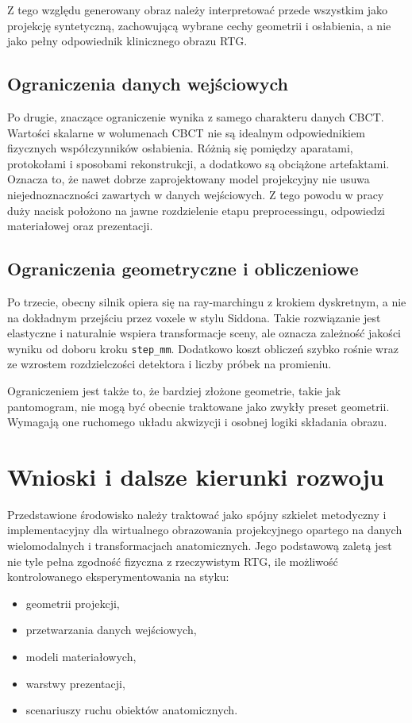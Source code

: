 \documentclass[11pt,a4paper]{article}
\begin{document}
Z tego względu generowany obraz należy interpretować przede wszystkim jako projekcję
syntetyczną, zachowującą wybrane cechy geometrii i osłabienia, a nie jako pełny
odpowiednik klinicznego obrazu RTG.

\subsection{Ograniczenia danych wejściowych}

Po drugie, znaczące ograniczenie wynika z samego charakteru danych CBCT.
Wartości skalarne w wolumenach CBCT nie są idealnym odpowiednikiem fizycznych
współczynników osłabienia. Różnią się pomiędzy aparatami, protokołami i sposobami
rekonstrukcji, a dodatkowo są obciążone artefaktami. Oznacza to, że nawet dobrze
zaprojektowany model projekcyjny nie usuwa niejednoznaczności zawartych w danych
wejściowych. Z tego powodu w pracy duży nacisk położono na jawne rozdzielenie
etapu preprocessingu, odpowiedzi materiałowej oraz prezentacji.

\subsection{Ograniczenia geometryczne i obliczeniowe}

Po trzecie, obecny silnik opiera się na ray-marchingu z krokiem dyskretnym, a nie
na dokładnym przejściu przez voxele w stylu Siddona. Takie rozwiązanie jest elastyczne
i naturalnie wspiera transformacje sceny, ale oznacza zależność jakości wyniku
od doboru kroku \texttt{step\_mm}. Dodatkowo koszt obliczeń szybko rośnie wraz
ze wzrostem rozdzielczości detektora i liczby próbek na promieniu.

Ograniczeniem jest także to, że bardziej złożone geometrie, takie jak pantomogram,
nie mogą być obecnie traktowane jako zwykły preset geometrii. Wymagają one ruchomego
układu akwizycji i osobnej logiki składania obrazu.

\section{Wnioski i dalsze kierunki rozwoju}

Przedstawione środowisko należy traktować jako spójny szkielet metodyczny i
implementacyjny dla wirtualnego obrazowania projekcyjnego opartego na danych
wielomodalnych i transformacjach anatomicznych. Jego podstawową zaletą jest
nie tyle pełna zgodność fizyczna z rzeczywistym RTG, ile możliwość kontrolowanego
eksperymentowania na styku:
\begin{itemize}
\item geometrii projekcji,
\item przetwarzania danych wejściowych,
\item modeli materiałowych,
\item warstwy prezentacji,
\item scenariuszy ruchu obiektów anatomicznych.
\end{itemize}
\end{document}
